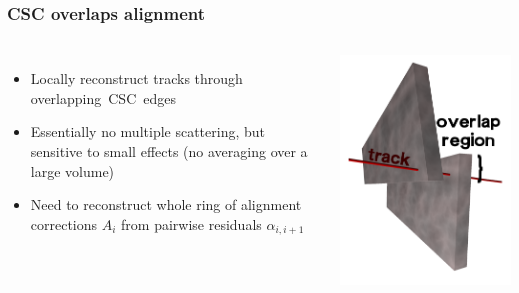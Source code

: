 \documentclass[compress]{beamer}
\begin{document}
\begin{frame}
\frametitle{CSC overlaps alignment}
\small

\begin{columns}
\small
{}
\begin{itemize}
\item Locally reconstruct tracks through \mbox{overlapping CSC edges\hspace{-1 cm}}
\item Essentially no multiple scattering, but sensitive to small effects (no averaging over a large volume)
\item Need to reconstruct whole ring of alignment corrections $A_i$ from pairwise residuals $\alpha_{i, i+1}$
\end{itemize}
\vspace{0.5 cm}
\includegraphics[width=\linewidth]{overlaps.png}
\end{columns}


\end{frame}
\end{document}
